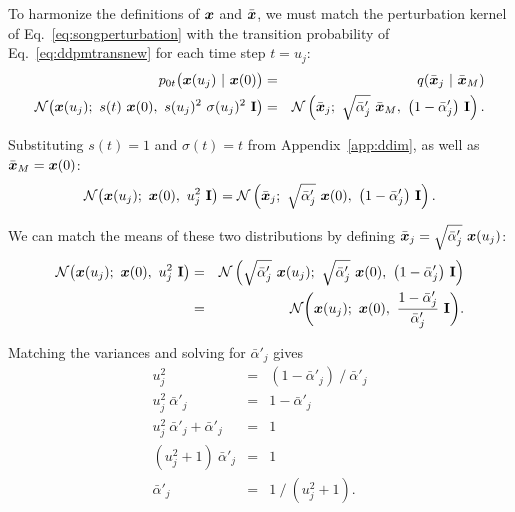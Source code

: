 To harmonize the definitions of $\boldsymbol{x}$ and $\bar{\boldsymbol{x}}$, we must match the perturbation kernel of Eq.~\ref{eq:songperturbation} with the transition probability of Eq.~\ref{eq:ddpmtransnew} for each time step $t = u_j$:
\begin{eqnarray}
  p_{0t}\big( \boldsymbol{x}(u_j) ~|~ \boldsymbol{x}(0) \big) &=& q(\bar{\boldsymbol{x}}_j ~|~ \bar{\boldsymbol{x}}_M) \\
  \mathcal{N} \big( \boldsymbol{x}(u_j); ~s(t) ~\boldsymbol{x}(0), ~s(u_j)^2 ~\sigma(u_j)^2 ~\mathbf{I} \big) &=& \mathcal{N}\left( \bar{\boldsymbol{x}}_j; ~\sqrt{\bar\alpha'_j} ~\bar{\boldsymbol{x}}_M, ~\big( 1 - \bar\alpha'_j \big) ~\mathbf{I} \right)
  \text{.}
\end{eqnarray}

Substituting $s(t) = 1$ and $\sigma(t) = t$ from Appendix~\ref{app:ddim}, as well as $\bar{\boldsymbol{x}}_M = \boldsymbol{x}(0)$:
\begin{equation}
  \mathcal{N} \big( \boldsymbol{x}(u_j); ~\boldsymbol{x}(0), ~u_j^2 ~\mathbf{I} \big) = \mathcal{N}\left( \bar{\boldsymbol{x}}_j; ~\sqrt{\bar\alpha'_j} ~\boldsymbol{x}(0), ~\big( 1 - \bar\alpha'_j \big) ~\mathbf{I} \right)
  \text{.}
\end{equation}

We can match the means of these two distributions by defining $\bar{\boldsymbol{x}}_j = \sqrt{\bar\alpha'_j} ~\boldsymbol{x}(u_j)$:
\begin{eqnarray}
  \mathcal{N} \big( \boldsymbol{x}(u_j); ~\boldsymbol{x}(0), ~u_j^2 ~\mathbf{I} \big) &=& \mathcal{N}\left( \sqrt{\bar\alpha'_j} ~\boldsymbol{x}(u_j); ~\sqrt{\bar\alpha'_j} ~\boldsymbol{x}(0), ~\big( 1 - \bar\alpha'_j \big) ~\mathbf{I} \right) \\
  &=& \mathcal{N}\bigg( \boldsymbol{x}(u_j); ~\boldsymbol{x}(0), ~\frac{1 - \bar\alpha'_j}{\bar\alpha'_j} ~\mathbf{I} \bigg)
  \text{.}
\end{eqnarray}

Matching the variances and solving for $\bar\alpha'_j$ gives
\begin{eqnarray}
  u_j^2 &=& (1 - \bar\alpha'_j) ~/~ \bar\alpha'_j \\
  u_j^2 ~\bar\alpha'_j &=& 1 - \bar\alpha'_j \\
  u_j^2 ~\bar\alpha'_j + \bar\alpha'_j &=& 1 \\
  (u_j^2 + 1) ~\bar\alpha'_j &=& 1 \\
  \bar\alpha'_j &=& 1 ~/~ (u_j^2 + 1)
  \text{.}
\end{eqnarray}


